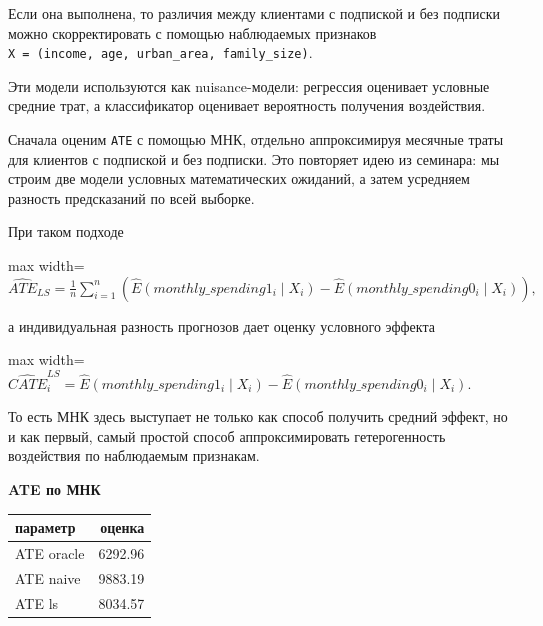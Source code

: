\documentclass[11pt]{article}
\newcounter{none}
\begin{document}
Если она выполнена, то различия между клиентами с подпиской и без
подписки можно скорректировать с помощью наблюдаемых признаков
\texttt{X\ =\ (income,\ age,\ urban\_area,\ family\_size)}.

    Эти модели используются как nuisance-модели: регрессия оценивает
условные средние трат, а классификатор оценивает вероятность получения
воздействия.

    Сначала оценим \texttt{ATE} с помощью МНК, отдельно аппроксимируя
месячные траты для клиентов с подпиской и без подписки. Это повторяет
идею из семинара: мы строим две модели условных математических ожиданий,
а затем усредняем разность предсказаний по всей выборке.

При таком подходе

\begin{center}
\begin{adjustbox}{max width=\linewidth}
\(\displaystyle \widehat{ATE}_{LS} = \frac{1}{n}\sum\limits_{i=1}^{n}\left(\widehat{E}(monthly\_spending1_i \mid X_i) - \widehat{E}(monthly\_spending0_i \mid X_i)\right),\)
\end{adjustbox}
\end{center}

а индивидуальная разность прогнозов дает оценку условного эффекта

\begin{center}
\begin{adjustbox}{max width=\linewidth}
\(\displaystyle \widehat{CATE}^{LS}_i = \widehat{E}(monthly\_spending1_i \mid X_i) - \widehat{E}(monthly\_spending0_i \mid X_i).\)
\end{adjustbox}
\end{center}

То есть МНК здесь выступает не только как способ получить средний
эффект, но и как первый, самый простой способ аппроксимировать
гетерогенность воздействия по наблюдаемым признакам.

    \textbf{ATE по МНК}

{\def\LTcaptype{none} %
\begin{longtable}[]{@{}lr@{}}
\toprule\noalign{}
параметр & оценка \\
\midrule\noalign{}
\endhead
\bottomrule\noalign{}
\endlastfoot
ATE oracle & 6292.96 \\
ATE naive & 9883.19 \\
ATE ls & 8034.57 \\
\end{longtable}
}
\end{document}
